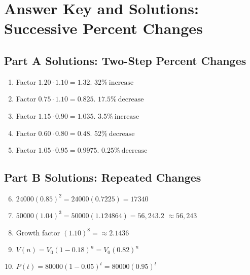 \documentclass[12pt]{article}
\begin{document}
\newpage


\section*{Answer Key and Solutions: Successive Percent Changes}

\subsection*{Part A Solutions: Two-Step Percent Changes}
\begin{enumerate}
  \item Factor \(1.20\cdot1.10=1.32\). \(\boxed{32\%\ \text{increase}}\)
  \item Factor \(0.75\cdot1.10=0.825\). \(\boxed{17.5\%\ \text{decrease}}\)
  \item Factor \(1.15\cdot0.90=1.035\). \(\boxed{3.5\%\ \text{increase}}\)
  \item Factor \(0.60\cdot0.80=0.48\). \(\boxed{52\%\ \text{decrease}}\)
  \item Factor \(1.05\cdot0.95=0.9975\). \(\boxed{0.25\%\ \text{decrease}}\)
\end{enumerate}

\subsection*{Part B Solutions: Repeated Changes}
\begin{enumerate}
  \setcounter{enumi}{5}
  \item \(24000(0.85)^2=24000(0.7225)=\boxed{17340}\)
  \item \(50000(1.04)^3=50000(1.124864)=\boxed{56{,}243.2}\) \(\approx \boxed{56{,}243}\)
  \item Growth factor \((1.10)^8=\boxed{\approx 2.1436}\)
  \item \(V(n)=V_0(1-0.18)^n=\boxed{V_0(0.82)^n}\)
  \item \(P(t)=80000(1-0.05)^t=\boxed{80000(0.95)^t}\)
\end{enumerate}
\end{document}
